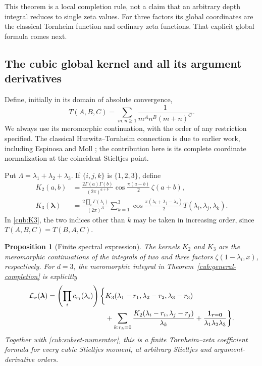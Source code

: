 \documentclass[11pt,a4paper]{article}
\newtheorem{proposition}[theorem]{Proposition}
\theoremstyle{definition}
\theoremstyle{remark}
\numberwithin{equation}{section}
\begin{document}
This theorem is a local completion rule, not a claim that an arbitrary
depth integral reduces to single zeta values.  For three factors its
global coordinates are the classical Tornheim function and ordinary
zeta functions.  That explicit global formula comes next.

\subsection{The cubic global kernel and all its argument derivatives}

Define, initially in its domain of absolute convergence,
\begin{equation}\label{cub:T-def}
 T(A,B,C)=\sum_{m,n\ge1}\frac{1}{m^A n^B(m+n)^C}.
\end{equation}
We always use its meromorphic continuation, with the order of any
restriction specified.  The classical Hurwitz--Tornheim connection is
due to earlier work, including Espinosa and Moll \cite{EM2006}; the
contribution here is its complete coordinate normalization at the
coincident Stieltjes point.

Put $\Lambda=\lambda_1+\lambda_2+\lambda_3$.  If $\{i,j,k\}$ is
$\{1,2,3\}$, define
\begin{align}
 K_2(a,b)&=\frac{2\Gamma(a)\Gamma(b)}{(2\pi)^{a+b}}
       \cos\frac{\pi(a-b)}2\,\zeta(a+b),\label{cub:K2}\\
 K_3(\boldsymbol\lambda)
 &=\frac{2\prod_i\Gamma(\lambda_i)}{(2\pi)^\Lambda}
   \sum_{k=1}^3
    \cos\frac{\pi(\lambda_i+\lambda_j-\lambda_k)}2
       T(\lambda_i,\lambda_j,\lambda_k).
       \label{cub:K3}
\end{align}
In \eqref{cub:K3}, the two indices other than $k$ may be taken in
increasing order, since $T(A,B,C)=T(B,A,C)$.

\begin{proposition}[Finite spectral expression]
\label{cub:global}
The kernels $K_2$ and $K_3$ are the meromorphic continuations of the
integrals of two and three factors $\zeta(1-\lambda_i,x)$,
respectively.  For $d=3$, the meromorphic integral in
Theorem~\ref{cub:general-completion} is explicitly
\begin{align}
 \mathcal L_{\boldsymbol r}(\boldsymbol\lambda)
 =\left(\prod_i c_{r_i}(\lambda_i)\right)
 \bigg\{&K_3(\lambda_1-r_1,\lambda_2-r_2,\lambda_3-r_3)
       \notag\\
 &+\sum_{k:r_k=0}\frac{
       K_2(\lambda_i-r_i,\lambda_j-r_j)}{\lambda_k}
       +\frac{\mathbf1_{\boldsymbol r=\boldsymbol0}}
                    {\lambda_1\lambda_2\lambda_3}\bigg\}.
 \label{cub:Lr}
\end{align}
Together with \eqref{cub:subset-numerator}, this is a finite
Tornheim--zeta coefficient formula for every cubic Stieltjes moment,
at arbitrary Stieltjes and argument-derivative orders.
\end{proposition}
\end{document}
